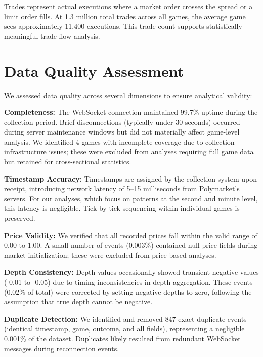 Trades represent actual executions where a market order crosses the spread or a limit order fills. At 1.3 million total trades across all games, the average game sees approximately 11,400 executions. This trade count supports statistically meaningful trade flow analysis.

\section{Data Quality Assessment}

We assessed data quality across several dimensions to ensure analytical validity:

\textbf{Completeness:} The WebSocket connection maintained 99.7\% uptime during the collection period. Brief disconnections (typically under 30 seconds) occurred during server maintenance windows but did not materially affect game-level analysis. We identified 4 games with incomplete coverage due to collection infrastructure issues; these were excluded from analyses requiring full game data but retained for cross-sectional statistics.

\textbf{Timestamp Accuracy:} Timestamps are assigned by the collection system upon receipt, introducing network latency of 5--15 milliseconds from Polymarket's servers. For our analyses, which focus on patterns at the second and minute level, this latency is negligible. Tick-by-tick sequencing within individual games is preserved.

\textbf{Price Validity:} We verified that all recorded prices fall within the valid range of 0.00 to 1.00. A small number of events (0.003\%) contained null price fields during market initialization; these were excluded from price-based analyses.

\textbf{Depth Consistency:} Depth values occasionally showed transient negative values (-0.01 to -0.05) due to timing inconsistencies in depth aggregation. These events (0.02\% of total) were corrected by setting negative depths to zero, following the assumption that true depth cannot be negative.

\textbf{Duplicate Detection:} We identified and removed 847 exact duplicate events (identical timestamp, game, outcome, and all fields), representing a negligible 0.001\% of the dataset. Duplicates likely resulted from redundant WebSocket messages during reconnection events.

